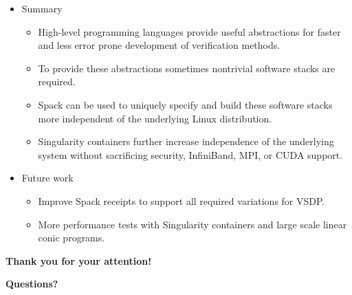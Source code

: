 \documentclass[xcolor=svgnames,xcolor=table,aspectratio=169]{beamer}
\begin{document}
\begin{frame}
\begin{itemize}
\itemsep2em
\item
Summary
\begin{itemize}
\itemsep1em
\item
High-level programming languages provide useful abstractions for faster
and less error prone development of verification methods.

\item
To provide these abstractions sometimes nontrivial software stacks are required.

\item
Spack can be used to uniquely specify and build these software stacks
more independent of the underlying Linux distribution.

\item
Singularity containers further increase independence of the underlying system
without sacrificing security, InfiniBand, MPI, or CUDA support.
\end{itemize}

\item
Future work
\begin{itemize}
\itemsep1em
\item
Improve Spack receipts to support all required variations for VSDP.

\item
More performance tests with Singularity containers
and large scale linear conic programs.
\end{itemize}
\end{itemize}
\end{frame}



\begin{frame}
\begin{center}
\textbf{\Large Thank you for your attention!}
\bigskip

\bigskip

\textbf{\Large Questions?}
\vfill
\end{center}
\end{frame}



\setcounter{finalframe}{\value{framenumber}}



\begin{frame}[allowframebreaks]
\printbibliography
\end{frame}



\setcounter{framenumber}{\value{finalframe}}
\end{document}
